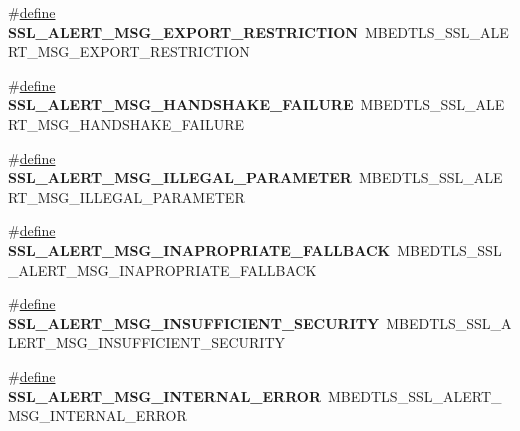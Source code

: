 \begin{DoxyCompactItemize}
\#\hyperlink{structdefine}{define} {\bfseries S\+S\+L\+\_\+\+A\+L\+E\+R\+T\+\_\+\+M\+S\+G\+\_\+\+E\+X\+P\+O\+R\+T\+\_\+\+R\+E\+S\+T\+R\+I\+C\+T\+I\+ON}~M\+B\+E\+D\+T\+L\+S\+\_\+\+S\+S\+L\+\_\+\+A\+L\+E\+R\+T\+\_\+\+M\+S\+G\+\_\+\+E\+X\+P\+O\+R\+T\+\_\+\+R\+E\+S\+T\+R\+I\+C\+T\+I\+ON
\item 
\mbox{\label{compat-1_83_8h_a21e00498ea9a069ec7f182a87ec8b177}} 
\#\hyperlink{structdefine}{define} {\bfseries S\+S\+L\+\_\+\+A\+L\+E\+R\+T\+\_\+\+M\+S\+G\+\_\+\+H\+A\+N\+D\+S\+H\+A\+K\+E\+\_\+\+F\+A\+I\+L\+U\+RE}~M\+B\+E\+D\+T\+L\+S\+\_\+\+S\+S\+L\+\_\+\+A\+L\+E\+R\+T\+\_\+\+M\+S\+G\+\_\+\+H\+A\+N\+D\+S\+H\+A\+K\+E\+\_\+\+F\+A\+I\+L\+U\+RE
\item 
\mbox{\label{compat-1_83_8h_ad93db03390f910032467790dab2593fe}} 
\#\hyperlink{structdefine}{define} {\bfseries S\+S\+L\+\_\+\+A\+L\+E\+R\+T\+\_\+\+M\+S\+G\+\_\+\+I\+L\+L\+E\+G\+A\+L\+\_\+\+P\+A\+R\+A\+M\+E\+T\+ER}~M\+B\+E\+D\+T\+L\+S\+\_\+\+S\+S\+L\+\_\+\+A\+L\+E\+R\+T\+\_\+\+M\+S\+G\+\_\+\+I\+L\+L\+E\+G\+A\+L\+\_\+\+P\+A\+R\+A\+M\+E\+T\+ER
\item 
\mbox{\label{compat-1_83_8h_a5e6540504a41cf8b326240f7d2295038}} 
\#\hyperlink{structdefine}{define} {\bfseries S\+S\+L\+\_\+\+A\+L\+E\+R\+T\+\_\+\+M\+S\+G\+\_\+\+I\+N\+A\+P\+R\+O\+P\+R\+I\+A\+T\+E\+\_\+\+F\+A\+L\+L\+B\+A\+CK}~M\+B\+E\+D\+T\+L\+S\+\_\+\+S\+S\+L\+\_\+\+A\+L\+E\+R\+T\+\_\+\+M\+S\+G\+\_\+\+I\+N\+A\+P\+R\+O\+P\+R\+I\+A\+T\+E\+\_\+\+F\+A\+L\+L\+B\+A\+CK
\item 
\mbox{\label{compat-1_83_8h_a5ee5ef076802f9d80a86676805daddeb}} 
\#\hyperlink{structdefine}{define} {\bfseries S\+S\+L\+\_\+\+A\+L\+E\+R\+T\+\_\+\+M\+S\+G\+\_\+\+I\+N\+S\+U\+F\+F\+I\+C\+I\+E\+N\+T\+\_\+\+S\+E\+C\+U\+R\+I\+TY}~M\+B\+E\+D\+T\+L\+S\+\_\+\+S\+S\+L\+\_\+\+A\+L\+E\+R\+T\+\_\+\+M\+S\+G\+\_\+\+I\+N\+S\+U\+F\+F\+I\+C\+I\+E\+N\+T\+\_\+\+S\+E\+C\+U\+R\+I\+TY
\item 
\mbox{\label{compat-1_83_8h_ae62074a176d711811f00e9a4a6a6596b}} 
\#\hyperlink{structdefine}{define} {\bfseries S\+S\+L\+\_\+\+A\+L\+E\+R\+T\+\_\+\+M\+S\+G\+\_\+\+I\+N\+T\+E\+R\+N\+A\+L\+\_\+\+E\+R\+R\+OR}~M\+B\+E\+D\+T\+L\+S\+\_\+\+S\+S\+L\+\_\+\+A\+L\+E\+R\+T\+\_\+\+M\+S\+G\+\_\+\+I\+N\+T\+E\+R\+N\+A\+L\+\_\+\+E\+R\+R\+OR
\item 

\end{DoxyCompactItemize}
